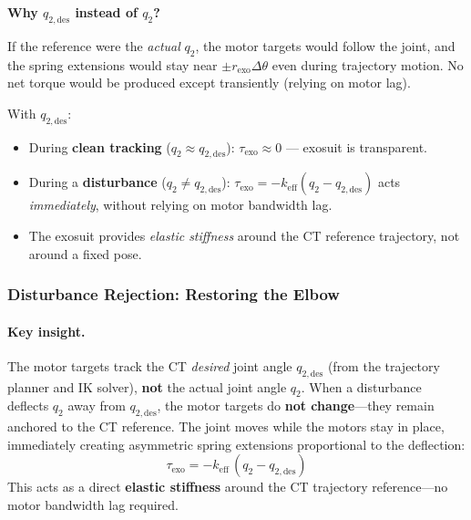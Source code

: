 \documentclass[11pt,a4paper]{article}
\begin{document}
\begin{resultbox}
\textbf{Why $q_{2,\mathrm{des}}$ instead of $q_2$?}

If the reference were the \emph{actual} $q_2$, the motor targets would follow
the joint, and the spring extensions would stay near $\pm r_{\mathrm{exo}}\Delta\theta$
even during trajectory motion.  No net torque would be produced except
transiently (relying on motor lag).

With $q_{2,\mathrm{des}}$:
\begin{itemize}[leftmargin=2em, itemsep=1pt]
    \item During \textbf{clean tracking} ($q_2 \approx q_{2,\mathrm{des}}$):
          $\tau_{\mathrm{exo}} \approx 0$ --- exosuit is transparent.
    \item During a \textbf{disturbance} ($q_2 \neq q_{2,\mathrm{des}}$):
          $\tau_{\mathrm{exo}} = -k_{\mathrm{eff}}(q_2 - q_{2,\mathrm{des}})$
          acts \emph{immediately}, without relying on motor bandwidth lag.
    \item The exosuit provides \emph{elastic stiffness} around the CT reference
          trajectory, not around a fixed pose.
\end{itemize}
\end{resultbox}


\subsubsection{Disturbance Rejection: Restoring the Elbow}
\label{sec:exo_disturbance}

\paragraph{Key insight.}
The motor targets track the CT \emph{desired} joint angle $q_{2,\mathrm{des}}$
(from the trajectory planner and IK solver), \textbf{not} the actual joint
angle $q_2$.  When a disturbance deflects $q_2$ away from $q_{2,\mathrm{des}}$,
the motor targets do \textbf{not change}---they remain anchored to the CT
reference.  The joint moves while the motors stay in place, immediately
creating asymmetric spring extensions proportional to the deflection:
\[
    \tau_{\mathrm{exo}} = -k_{\mathrm{eff}}\,(q_2 - q_{2,\mathrm{des}})
\]
This acts as a direct \textbf{elastic stiffness} around the CT trajectory
reference---no motor bandwidth lag required.
\end{document}
